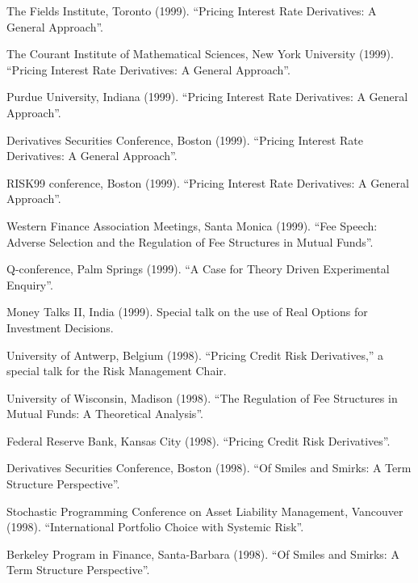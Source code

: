 \documentclass{article}
\begin{document}
\begin{etaremune}
{\item The Fields Institute, Toronto (1999). 
``Pricing Interest Rate Derivatives: A General Approach''. 

\item The Courant Institute of Mathematical Sciences, New York
University (1999). 
``Pricing Interest Rate Derivatives: A General Approach''. 

\item Purdue University, Indiana (1999). 
``Pricing Interest Rate Derivatives: A General Approach''. 

\item Derivatives Securities Conference, Boston (1999).
``Pricing Interest Rate Derivatives: A General Approach''. 

\item RISK99 conference, Boston (1999).
``Pricing Interest Rate Derivatives: A General Approach''. 

\item Western Finance Association Meetings, Santa Monica (1999).
``Fee Speech: Adverse Selection and the Regulation of Fee 
Structures in Mutual Funds''. 

\item Q-conference, Palm Springs (1999). 
``A Case for Theory Driven Experimental Enquiry''. 

\item Money Talks II, India (1999). Special talk on the use
of Real Options for Investment Decisions.

\item University of Antwerp, Belgium (1998). ``Pricing Credit Risk 
Derivatives,'' a special talk for the Risk Management Chair.

\item University of Wisconsin, Madison (1998). 
``The Regulation of Fee Structures in Mutual Funds: A Theoretical Analysis''. 
 

\item Federal Reserve Bank, Kansas City (1998). 
``Pricing Credit Risk Derivatives''.

\item Derivatives Securities Conference, Boston (1998).
``Of Smiles and Smirks: A Term Structure Perspective''. 

\item Stochastic Programming Conference on Asset Liability Management,
Vancouver (1998).
``International Portfolio Choice with Systemic Risk''.

\item Berkeley Program in Finance, Santa-Barbara (1998).
``Of Smiles and Smirks: A Term Structure Perspective''. 

}
\end{etaremune}
\end{document}
